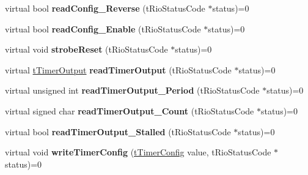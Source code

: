 \begin{DoxyCompactItemize}
\item 
\hypertarget{classnFPGA_1_1nFRC__2012__1__6__4_1_1tEncoder_a3c8d820a645cceee709e12047f53e865}{
virtual bool {\bfseries readConfig\_\-Reverse} (tRioStatusCode $\ast$status)=0}
\label{classnFPGA_1_1nFRC__2012__1__6__4_1_1tEncoder_a3c8d820a645cceee709e12047f53e865}

\item 
\hypertarget{classnFPGA_1_1nFRC__2012__1__6__4_1_1tEncoder_add11decc5f48b33e333053e4c6a29ca4}{
virtual bool {\bfseries readConfig\_\-Enable} (tRioStatusCode $\ast$status)=0}
\label{classnFPGA_1_1nFRC__2012__1__6__4_1_1tEncoder_add11decc5f48b33e333053e4c6a29ca4}

\item 
\hypertarget{classnFPGA_1_1nFRC__2012__1__6__4_1_1tEncoder_a48b6afefc850d24fe7c6cf1fe08b48be}{
virtual void {\bfseries strobeReset} (tRioStatusCode $\ast$status)=0}
\label{classnFPGA_1_1nFRC__2012__1__6__4_1_1tEncoder_a48b6afefc850d24fe7c6cf1fe08b48be}

\item 
\hypertarget{classnFPGA_1_1nFRC__2012__1__6__4_1_1tEncoder_aec9f75027f5f89367fe26007cc874433}{
virtual \hyperlink{unionnFPGA_1_1nFRC__2012__1__6__4_1_1tEncoder_1_1tTimerOutput}{tTimerOutput} {\bfseries readTimerOutput} (tRioStatusCode $\ast$status)=0}
\label{classnFPGA_1_1nFRC__2012__1__6__4_1_1tEncoder_aec9f75027f5f89367fe26007cc874433}

\item 
\hypertarget{classnFPGA_1_1nFRC__2012__1__6__4_1_1tEncoder_a8c1ceda6b67f97d9185d7f051efaaf82}{
virtual unsigned int {\bfseries readTimerOutput\_\-Period} (tRioStatusCode $\ast$status)=0}
\label{classnFPGA_1_1nFRC__2012__1__6__4_1_1tEncoder_a8c1ceda6b67f97d9185d7f051efaaf82}

\item 
\hypertarget{classnFPGA_1_1nFRC__2012__1__6__4_1_1tEncoder_ac38ab72f7ba2314a36b8302e2079b560}{
virtual signed char {\bfseries readTimerOutput\_\-Count} (tRioStatusCode $\ast$status)=0}
\label{classnFPGA_1_1nFRC__2012__1__6__4_1_1tEncoder_ac38ab72f7ba2314a36b8302e2079b560}

\item 
\hypertarget{classnFPGA_1_1nFRC__2012__1__6__4_1_1tEncoder_a6f6616dbfed16d42832a0c38d6eb0c25}{
virtual bool {\bfseries readTimerOutput\_\-Stalled} (tRioStatusCode $\ast$status)=0}
\label{classnFPGA_1_1nFRC__2012__1__6__4_1_1tEncoder_a6f6616dbfed16d42832a0c38d6eb0c25}

\item 
\hypertarget{classnFPGA_1_1nFRC__2012__1__6__4_1_1tEncoder_a819ad903337f126aba6ec47f3334785f}{
virtual void {\bfseries writeTimerConfig} (\hyperlink{unionnFPGA_1_1nFRC__2012__1__6__4_1_1tEncoder_1_1tTimerConfig}{tTimerConfig} value, tRioStatusCode $\ast$status)=0}
\label{classnFPGA_1_1nFRC__2012__1__6__4_1_1tEncoder_a819ad903337f126aba6ec47f3334785f}


\end{DoxyCompactItemize}
